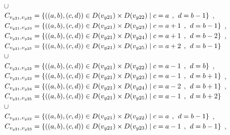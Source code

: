 \\$\cup$
\\$C_{v_{y21},v_{y22}}=\{((a,b),(c,d))\in D(v_{y21}) \times D(v_{y22})\mid c = a   \hspace{1ex} , \hspace{1ex}  d = b - 1 \}$ , 
\\$C_{v_{y21},v_{y23}}=\{((a,b),(c,d))\in D(v_{y21}) \times D(v_{y23})\mid c = a + 1\hspace{1ex} , \hspace{1ex}  d = b - 1 \}$ , 
\\$C_{v_{y21},v_{y24}}=\{((a,b),(c,d))\in D(v_{y21}) \times D(v_{y24})\mid c = a + 1\hspace{1ex} , \hspace{1ex}  d = b - 2 \}$ , 
\\$C_{v_{y21},v_{y25}}=\{((a,b),(c,d))\in D(v_{y21}) \times D(v_{y25})\mid c = a + 2\hspace{1ex} , \hspace{1ex}  d = b - 1 \}$  
\\$\cup$
\\$C_{v_{y21},v_{y22}}=\{((a,b),(c,d))\in D(v_{y21}) \times D(v_{y22})\mid c = a - 1\hspace{1ex} , \hspace{1ex}  d = b    \}$ , 
\\$C_{v_{y21},v_{y23}}=\{((a,b),(c,d))\in D(v_{y21}) \times D(v_{y23})\mid c = a - 1\hspace{1ex} , \hspace{1ex}  d = b + 1 \}$ , 
\\$C_{v_{y21},v_{y24}}=\{((a,b),(c,d))\in D(v_{y21}) \times D(v_{y24})\mid c = a - 2\hspace{1ex} , \hspace{1ex}  d = b + 1 \}$ , 
\\$C_{v_{y21},v_{y25}}=\{((a,b),(c,d))\in D(v_{y21}) \times D(v_{y25})\mid c = a - 1\hspace{1ex} , \hspace{1ex}  d = b + 2 \}$  
\\$\cup$
\\$C_{v_{y21},v_{y22}}=\{((a,b),(c,d))\in D(v_{y21}) \times D(v_{y22})\mid c = a  \hspace{1ex} , \hspace{1ex}  d = b - 1 \}$ , 
\\$C_{v_{y21},v_{y23}}=\{((a,b),(c,d))\in D(v_{y21}) \times D(v_{y23})\mid c = a - 1\hspace{1ex} , \hspace{1ex}  d = b - 1 \}$ , 
